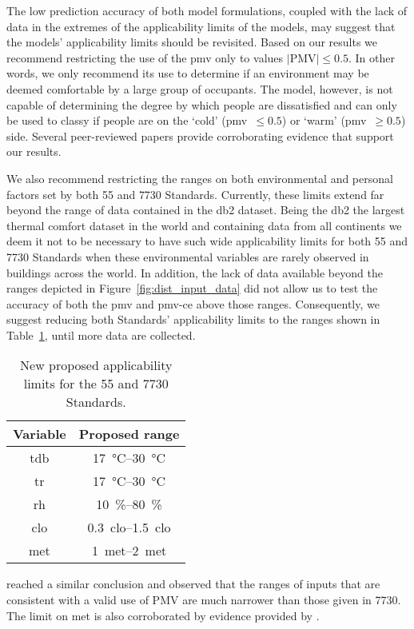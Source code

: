 The low prediction accuracy of both model formulations, coupled with the lack of data in the extremes of the applicability limits of the models, may suggest that the models' applicability limits should be revisited.
Based on our results we recommend restricting the use of the \ac{pmv} only to values $\lvert \textrm{PMV}\lvert \leq 0.5$.
In other words, we only recommend its use to determine if an environment may be deemed comfortable by a large group of occupants.
The model, however, is not capable of determining the degree by which people are dissatisfied and can only be used to classy if people are on the `cold' (\ac{pmv}~$\leq 0.5$) or `warm' (\ac{pmv}~$\geq 0.5$) side.
Several peer-reviewed papers \cite{Cheung2019, Yao2022, kim2019thermal, tartarini2018thermal, Humphreys2002, doherty_evaluation_1988, tartarini_prediction_2023} provide corroborating evidence that support our results.

We also recommend restricting the ranges on both environmental and personal factors set by both \gls{55} and \gls{7730} Standards.
Currently, these limits extend far beyond the range of data contained in the \ac{db2} dataset.
Being the \ac{db2} the largest thermal comfort dataset in the world and containing data from all continents we deem it not to be necessary to have such wide applicability limits for both \gls{55} and \gls{7730} Standards when these environmental variables are rarely observed in buildings across the world.
In addition, the lack of data available beyond the ranges depicted in Figure~\ref{fig:dist_input_data} did not allow us to test the accuracy of both the \ac{pmv} and \ac{pmv-ce} above those ranges.
Consequently, we suggest reducing both Standards' applicability limits to the ranges shown in Table~\ref{tab:ranges}, until more data are collected.
\begin{table}[htb!]
    \centering
    \begin{tabular}{cc}
        \toprule
        Variable & Proposed range \\
        \midrule
        \ac{tdb} & \qtyrange{17}{30}{\celsius} \\
        \ac{tr} & \qtyrange{17}{30}{\celsius} \\
        \ac{rh} & \qtyrange{10}{80}{\percent} \\
        \ac{clo} & \qtyrange{0.3}{1.5}{clo} \\
        \ac{met} & \qtyrange{1}{2}{met} \\
        \bottomrule
    \end{tabular}
    \caption{New proposed applicability limits for the \gls{55} and \gls{7730} Standards.}
    \label{tab:ranges}
\end{table}
 reached a similar conclusion and observed that the ranges of inputs that are consistent with a valid use of PMV are much narrower than those given in \gls{7730}.
The limit on \ac{met} is also corroborated by evidence provided by .

